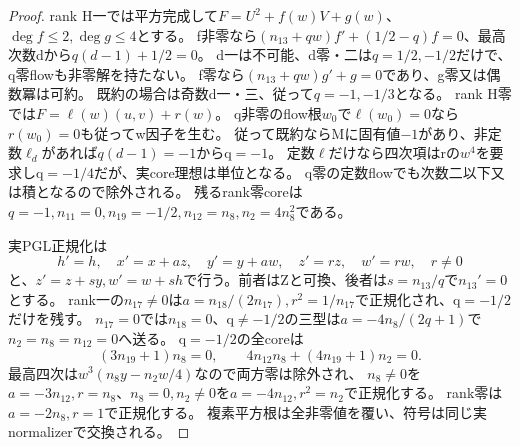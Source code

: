 \documentclass[a4paper,11pt]{ltjsarticle}
\theoremstyle{definition}
\begin{document}
\begin{proof}
rank H一では平方完成して$F=U^2+f(w)V+g(w)$、$\deg f\le2,\deg g\le4$とする。
f非零なら$(n_{13}+qw)f'+(1/2-q)f=0$、最高次数dから$q(d-1)+1/2=0$。
d一は不可能、d零・二は$q=1/2,-1/2$だけで、q零flowも非零解を持たない。
f零なら$(n_{13}+qw)g'+g=0$であり、g零又は偶数冪は可約。
既約の場合は奇数d一・三、従って$q=-1,-1/3$となる。
rank H零では$F=\ell(w)(u,v)+r(w)$。
q非零のflow根$w_0$で$\ell(w_0)=0$なら$r(w_0)=0$も従ってw因子を生む。
従って既約ならMに固有値$-1$があり、非定数$\ell_d$があれば$q(d-1)=-1$からq$=-1$。
定数$\ell$だけなら四次項はrの$w^4$を要求しq$=-1/4$だが、実core理想は単位となる。
q零の定数flowでも次数二以下又は積となるので除外される。
残るrank零coreは$q=-1,n_{11}=0,n_{19}=-1/2,n_{12}=n_8,n_2=4n_8^2$である。

実PGL正規化は
\[
 h'=h,\quad x'=x+az,\quad y'=y+aw,\quad z'=rz,\quad w'=rw,\quad r\ne0
\]
と、$z'=z+sy,w'=w+sh$で行う。前者はZと可換、後者は$s=n_{13}/q$で$n_{13}'=0$とする。
rank一の$n_{17}\ne0$は$a=n_{18}/(2n_{17}),r^2=1/n_{17}$で正規化され、q$=-1/2$だけを残す。
$n_{17}=0$では$n_{18}=0$、q$\ne-1/2$の三型は$a=-4n_8/(2q+1)$で$n_2=n_8=n_{12}=0$へ送る。
q$=-1/2$の全coreは
\[
 (3n_{19}+1)n_8=0,\qquad4n_{12}n_8+(4n_{19}+1)n_2=0.
\]
最高四次は$w^3(n_8y-n_2w/4)$なので両方零は除外され、
$n_8\ne0$を$a=-3n_{12},r=n_8$、$n_8=0,n_2\ne0$を$a=-4n_{12},r^2=n_2$で正規化する。
rank零は$a=-2n_8,r=1$で正規化する。
複素平方根は全非零値を覆い、符号は同じ実normalizerで交換される。


\end{proof}
\end{document}
